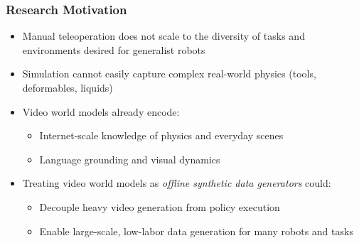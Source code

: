 \documentclass{beamer}
\begin{document}
\begin{frame}
  \frametitle{Research Motivation}
  \small
  \begin{itemize}
    \item Manual teleoperation does not scale to the diversity of tasks and environments desired for generalist robots
    \item Simulation cannot easily capture complex real-world physics (tools, deformables, liquids)
    \item Video world models already encode:
      \begin{itemize}
        \item Internet-scale knowledge of physics and everyday scenes
        \item Language grounding and visual dynamics
      \end{itemize}
    \item Treating video world models as \emph{offline synthetic data generators} could:
      \begin{itemize}
        \item Decouple heavy video generation from policy execution
        \item Enable large-scale, low-labor data generation for many robots and tasks
      \end{itemize}
  \end{itemize}
\end{frame}
\end{document}
